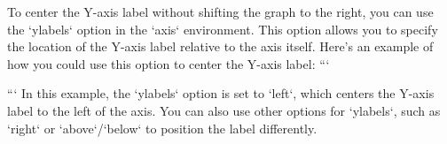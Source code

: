 To center the Y-axis label without shifting the graph to the right, you can use the `ylabels` option in the `axis` environment. This option allows you to specify the location of the Y-axis label relative to the axis itself.
Here's an example of how you could use this option to center the Y-axis label:
```
```
In this example, the `ylabels` option is set to `{left}`, which centers the Y-axis label to the left of the axis. You can also use other options for `ylabels`, such as `{right}` or `{above}`/`{below}` to position the label differently.